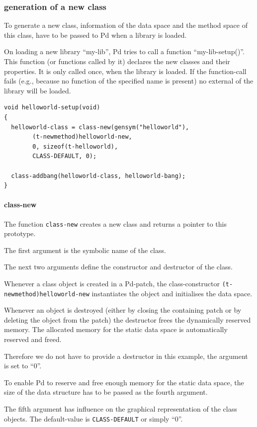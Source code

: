 \documentclass[draft]{ppgmus}
\begin{document}
\subsubsection{generation of a new class}
To generate a new class, information of the data space and the method space of this class,
have to be passed to Pd when a library is loaded.

On loading a new library ``my-lib'',
Pd tries to call a function ``my-lib-setup()''.
This function (or functions called by it) 
declares the new classes and their properties.
It is only called once, when the library is loaded.
If the function-call fails (e.g., because no function of the specified name is present)
no external of the library will be loaded.

\begin{verbatim}
void helloworld-setup(void)
{
  helloworld-class = class-new(gensym("helloworld"),
        (t-newmethod)helloworld-new,
        0, sizeof(t-helloworld),
        CLASS-DEFAULT, 0);

  class-addbang(helloworld-class, helloworld-bang);
}
\end{verbatim}

\paragraph{class-new}

The function \verb+class-new+ creates a new class and returns a pointer to this prototype.

The first argument is the symbolic name of the class.

The next two arguments define the constructor and destructor of the class.

Whenever a class object is created in a Pd-patch,
the class-constructor \verb+(t-newmethod)helloworld-new+ instantiates the object
and initialises the data space.

Whenever an object is destroyed
(either by closing the containing patch or by deleting the object from the patch)
the destructor frees the dynamically reserved memory.
The allocated memory for the static data space is automatically reserved and freed.

Therefore we do not have to provide a destructor in this example, the argument
is set to ``0''.

To enable Pd to reserve and free enough memory for the static data space,
the size of the data structure has to be passed as the fourth argument.

The fifth argument has influence on the graphical representation of the class objects.
The default-value is \verb+CLASS-DEFAULT+ or simply ``0''.
\end{document}
